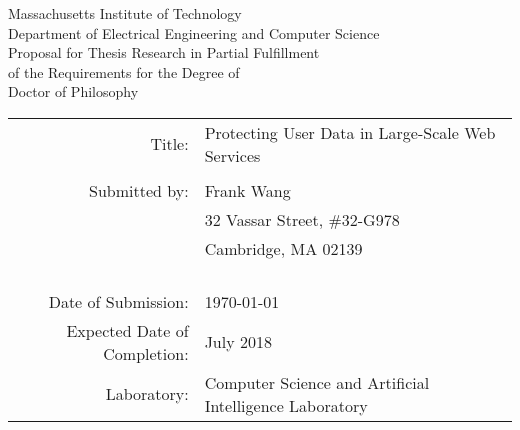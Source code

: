 \thispagestyle{empty}
\def\brule#1{\vrule width#1 height -1.1pt depth 1.5pt\relax}

\def\titleone{Protecting User Data in Large-Scale Web Services}
\def\author{Frank Wang}
\def\addrone{32 Vassar Street, \#32-G978}
\def\addrtwo{Cambridge, MA  02139}

\def\degree{Doctor of Philosophy}
\def\deptname{Electrical Engineering and Computer Science}
\def\laboratory{Computer Science and Artificial Intelligence
  Laboratory}

\def\submissiondate{\today}
\def\completiondate{July 2018}




\begin{center}
{\large \sc   
  Massachusetts Institute of Technology
\\ Department of \deptname \\}
\vspace{.2in}
{\large \sc
   Proposal for Thesis Research in Partial Fulfillment
\\ of the Requirements for the Degree of
\\ \degree \\}
\end{center}

\vspace{.3in}

\def\sig{{\small \sc (Signature of Author)}}

\begin{tabular}{r l c}
   {\small \sc Title:}                       & \multicolumn{2}{l}{\titleone} \\
\\ {\small \sc Submitted by:}
                            & \author  & \\
                            & \addrone & \\
                            & \addrtwo & \\  \\
                            & \cline{1-1} \vspace{-0.2in} &  \\

			                & \makebox[1.8in][c]{\sig} & \\
			    
\\ {\small \sc Date of Submission:}          & \multicolumn{2}{l}{\submissiondate}
\\ {\small \sc Expected Date of Completion:} & \multicolumn{2}{l}{\completiondate}
\\ {\small \sc Laboratory:}                  & \multicolumn{2}{l}{\laboratory}
\end{tabular}

